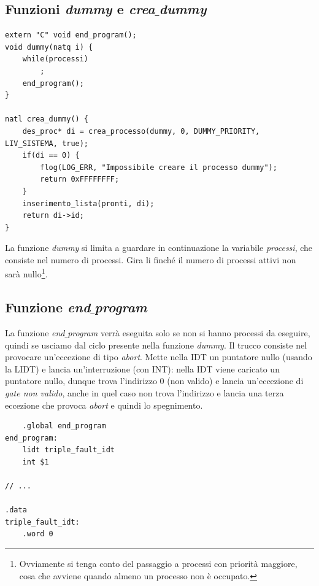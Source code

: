 \documentclass[11pt]{report}
\theoremstyle{definition}
\begin{document}
\subsection{Funzioni \emph{dummy} e \emph{crea$\_$dummy}}
\small
\begin{verbatim}
extern "C" void end_program();
void dummy(natq i) {
    while(processi)
        ;
    end_program();
}

natl crea_dummy() {
    des_proc* di = crea_processo(dummy, 0, DUMMY_PRIORITY, LIV_SISTEMA, true);
    if(di == 0) {
        flog(LOG_ERR, "Impossibile creare il processo dummy");
        return 0xFFFFFFFF;
    }
    inserimento_lista(pronti, di);
    return di->id;
}
\end{verbatim}
\normalsize 
La funzione \emph{dummy} si limita a guardare in continuazione la variabile \emph{processi}, che consiste nel numero di processi. Gira li finché il numero di processi attivi non sarà nullo\footnote{Ovviamente si tenga conto del passaggio a processi con priorità maggiore, cosa che avviene quando almeno un processo non è occupato.}.

\subsection{Funzione \emph{end$\_$program}} 
La funzione \emph{end$\_$program} verrà eseguita solo se non si hanno processi da eseguire, quindi se usciamo dal ciclo presente nella funzione \emph{dummy}. Il trucco consiste nel provocare un'eccezione di tipo \emph{abort}. Mette nella IDT un puntatore nullo (usando la LIDT) e lancia un'interruzione (con INT): nella IDT viene caricato un puntatore nullo, dunque trova l'indirizzo $0$ (non valido) e lancia un'eccezione di \emph{gate non valido}, anche in quel caso non trova l'indirizzo e lancia una terza eccezione che provoca \emph{abort} e quindi lo spegnimento.
\begin{verbatim}
    .global end_program
end_program: 
    lidt triple_fault_idt 
    int $1

// ...
   
.data 
triple_fault_idt:
    .word 0
\end{verbatim}
\end{document}
